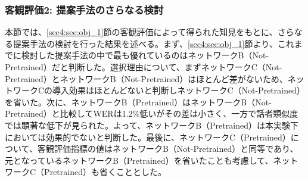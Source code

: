 \documentclass[12pt]{jarticle}
\numberwithin{equation}{section}    %
\numberwithin{figure}{section}      %
\numberwithin{table}{section}      %
\begin{document}
\subsubsection{客観評価2: 提案手法のさらなる検討}
\label{sec4:sec:obj_2}
本節では、\ref{sec4:sec:obj_1}節の客観評価によって得られた知見をもとに、さらなる提案手法の検討を行った結果を述べる。まず、\ref{sec4:sec:obj_1}節より、これまでに検討した提案手法の中で最も優れているのはネットワークB（Not-Pretrained）だと判断した。選択理由について、まずネットワークC（Not-Pretrained）とネットワークB（Not-Pretrained）はほとんど差がないため、ネットワークCの導入効果はほとんどないと判断しネットワークC（Not-Pretrained）を省いた。次に、ネットワークB（Pretrained）はネットワークB（Not-Pretrained）と比較してWERは1.2\%低いがその差は小さく、一方で話者類似度では顕著な低下が見られた。よって、ネットワークB（Pretrained）は本実験下においては効果的でないと判断した。最後に、ネットワークC（Pretrained）について、客観評価指標の値はネットワークB（Not-Pretrained）と同等であり、元となっているネットワークB（Pretrained）を省いたことも考慮して、ネットワークC（Pretrained）も省くこととした。
\end{document}
